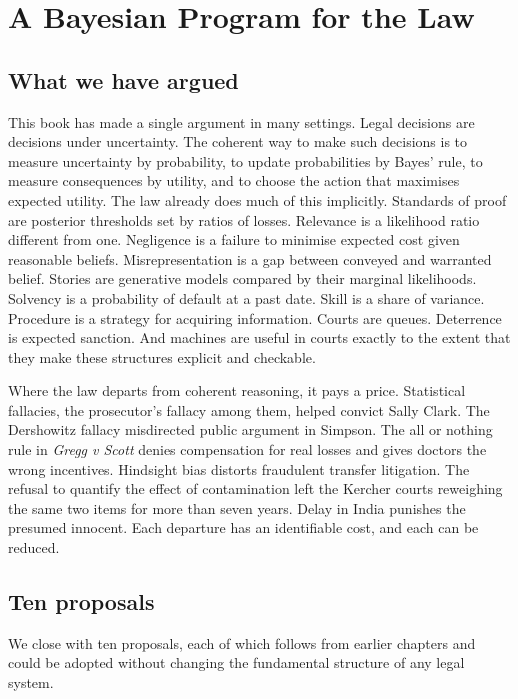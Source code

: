 \chapter{A Bayesian Program for the Law}
\label{ch:program}

\section{What we have argued}

This book has made a single argument in many settings. Legal decisions are decisions under uncertainty. The coherent way to make such decisions is to measure uncertainty by probability, to update probabilities by Bayes' rule, to measure consequences by utility, and to choose the action that maximises expected utility. The law already does much of this implicitly. Standards of proof are posterior thresholds set by ratios of losses. Relevance is a likelihood ratio different from one. Negligence is a failure to minimise expected cost given reasonable beliefs. Misrepresentation is a gap between conveyed and warranted belief. Stories are generative models compared by their marginal likelihoods. Solvency is a probability of default at a past date. Skill is a share of variance. Procedure is a strategy for acquiring information. Courts are queues. Deterrence is expected sanction. And machines are useful in courts exactly to the extent that they make these structures explicit and checkable.

Where the law departs from coherent reasoning, it pays a price. Statistical fallacies, the prosecutor's fallacy among them, helped convict Sally Clark. The Dershowitz fallacy misdirected public argument in Simpson. The all or nothing rule in \emph{Gregg v Scott} denies compensation for real losses and gives doctors the wrong incentives. Hindsight bias distorts fraudulent transfer litigation. The refusal to quantify the effect of contamination left the Kercher courts reweighing the same two items for more than seven years. Delay in India punishes the presumed innocent. Each departure has an identifiable cost, and each can be reduced.

\section{Ten proposals}

We close with ten proposals, each of which follows from earlier chapters and could be adopted without changing the fundamental structure of any legal system.

